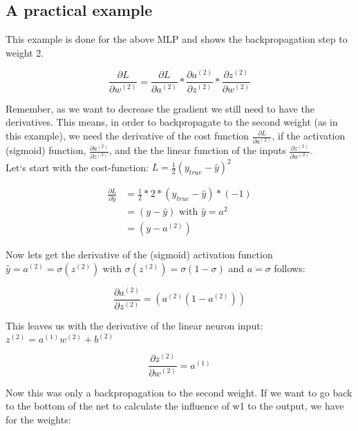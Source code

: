 
\subsection{A practical example}

This example is done for the above MLP and shows the backpropagation step to weight 2.

$$\frac{\partial L}{\partial w^{(2)}} = \frac{\partial L}{\partial a^{(2)}} * \frac{\partial a^{(2)}}{\partial z^{(2)}} * \frac{\partial z^{(2)}}{\partial w^{(2)}}$$

Remember, as we want to decrease the gradient we still need to have the derivatives. This means, in order to backpropagate to the second weight (as in this example), we need the derivative of the cost function $\frac{\partial L}{\partial a^{(2)}}$, if the activation (sigmoid) function, $\frac{\partial a^{(2)}}{\partial z^{(2)}}$, and the the linear function of the inputs $\frac{\partial z^{(2)}}{\partial w^{(2)}}$. \\

Let‘s start with the cost-function: $L = \frac{1}{2}(y_{true}-\hat{y})^2$

\begin{align*}
	\frac{\partial L}{\partial \hat{y}}	&= \frac{1}{2}*2*(y_{true}-\hat{y})*(-1) \\
										&= (y - \hat{y}) \text{  with  } \hat{y} = a^2 \\
										&= (y - a^{(2)})
\end{align*}

Now lets get the derivative of the (sigmoid) activation function $\hat{y} = a^{(2)} = \sigma(z^{(2)})$ with $\sigma(z^{(2)}) = \sigma(1 - \sigma)$ and $a = \sigma$ follows:

$$\frac{\partial a^{(2)}}{\partial z^{(2)}} = (a^{(2)}(1-a^{(2)}))$$

This leaves us with the derivative of the linear neuron input: $z^{(2)} = a^{(1)}w^{(2)}+b^{(2)}$

$$\frac{\partial z^{(2)}}{\partial w^{(2)}} = a^{(1)}$$


Now this was only a backpropagation to the second weight. If we want to go back to the bottom of the net to calculate the influence of w1 to the output, we have for the weights:

